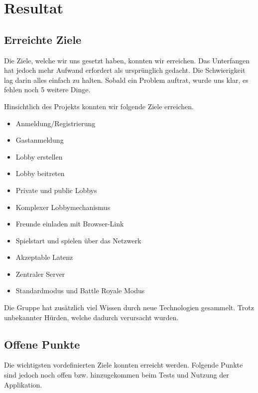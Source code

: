 \documentclass[11pt,ngerman]{article}
\begin{document}


    \section{Resultat}

    \subsection{Erreichte Ziele}
    Die Ziele, welche wir uns gesetzt haben, konnten wir erreichen. Das Unterfangen hat jedoch mehr Aufwand erfordert als ursprünglich gedacht. Die Schwierigkeit lag darin alles einfach zu halten. Sobald ein Problem auftrat, wurde uns klar, es fehlen noch 5 weitere Dinge.

    Hinsichtlich des Projekts konnten wir folgende Ziele erreichen.

	\begin{itemize}
		\item Anmeldung/Registrierung
		\item Gastanmeldung
		\item Lobby erstellen
		\item Lobby beitreten
		\item Private und public Lobbys
		\item Komplexer Lobbymechanismus
		\item Freunde einladen mit Browser-Link
		\item Spielstart und spielen über das Netzwerk
		\item Akzeptable Latenz
		\item Zentraler Server
		\item Standardmodus und Battle Royale Modus
	\end{itemize}
    Die Gruppe hat zusätzlich viel Wissen durch neue Technologien gesammelt. Trotz unbekannter Hürden, welche dadurch verursacht wurden.

    \subsection{Offene Punkte}
    Die wichtigsten vordefinierten Ziele konnten erreicht werden. Folgende Punkte sind jedoch noch offen bzw. hinzugekommen beim Tests und Nutzung der Applikation.
\end{document}
